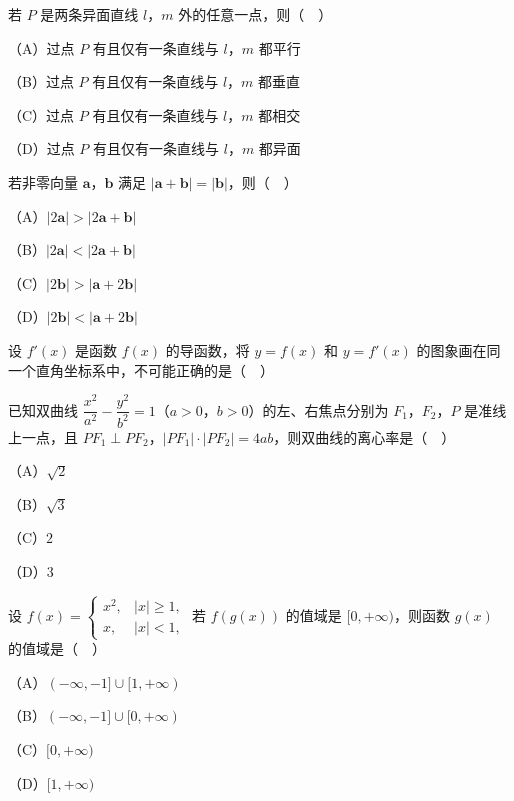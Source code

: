 \begin{question}
若 $P$ 是两条异面直线 $l$，$m$ 外的任意一点，则（　）

（A）过点 $P$ 有且仅有一条直线与 $l$，$m$ 都平行

（B）过点 $P$ 有且仅有一条直线与 $l$，$m$ 都垂直

（C）过点 $P$ 有且仅有一条直线与 $l$，$m$ 都相交

（D）过点 $P$ 有且仅有一条直线与 $l$，$m$ 都异面

\end{question}
\begin{question}
若非零向量 $\boldsymbol a$，$\boldsymbol b$ 满足 $|\boldsymbol a+\boldsymbol b|=|\boldsymbol b|$，则（　）

（A）$|2\boldsymbol a|>|2\boldsymbol a+\boldsymbol b|$

（B）$|2\boldsymbol a|<|2\boldsymbol a+\boldsymbol b|$

（C）$|2\boldsymbol b|>|\boldsymbol a+2\boldsymbol b|$

（D）$|2\boldsymbol b|<|\boldsymbol a+2\boldsymbol b|$

\Needspace{0.4\textheight}
\end{question}
\begin{question}
设 $f'(x)$ 是函数 $f(x)$ 的导函数，将 $y=f(x)$ 和 $y=f'(x)$ 的图象画在同一个直角坐标系中，不可能正确的是（　）
\nopagebreak[4]
\begin{center}\end{center}
\nopagebreak[4]
\end{question}
\begin{question}
已知双曲线 $\dfrac{x^2}{a^2}-\dfrac{y^2}{b^2}=1$（$a>0$，$b>0$）的左、右焦点分别为 $F_1$，$F_2$，$P$ 是准线上一点，且 $PF_1\perp PF_2$，$|PF_1|\cdot|PF_2|=4ab$，则双曲线的离心率是（　）

（A）$\sqrt2$

（B）$\sqrt3$

（C）$2$

（D）$3$

\end{question}
\begin{question}
设 $f(x)=\begin{cases}x^2,&|x|\geqslant1,\\ x,&|x|<1,\end{cases}$ 若 $f(g(x))$ 的值域是 $[0,+\infty)$，则函数 $g(x)$ 的值域是（　）

（A）$(-\infty,-1]\cup[1,+\infty)$

（B）$(-\infty,-1]\cup[0,+\infty)$

（C）$[0,+\infty)$

（D）$[1,+\infty)$

\end{question}

